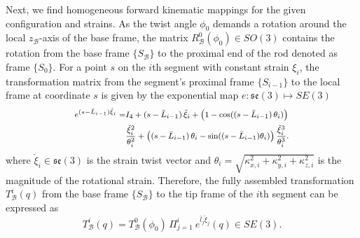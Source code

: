 Next, we find homogeneous forward kinematic mappings for the given configuration and strains.
As the twist angle $\phi_0$ demands a rotation around the local $z_{\mathcal{B}}$-axis of the base frame, the matrix $R_{\mathcal{B}}^0(\phi_0) \in SO(3)$ contains the rotation from the base frame $\{ S_{\mathcal{B}} \}$ to the proximal end of the rod denoted as frame $\{ S_{0} \}$.
For a point $s$ on the $i$th segment with constant strain $\xi_i$, the transformation matrix from the segment's proximal frame $\{ S_{i-1} \}$ to the local frame at coordinate $s$ is given by the exponential map $e: \mathfrak{se}(3) \mapsto SE(3)$~\cite{renda2018discrete}
\begin{equation}\footnotesize
\begin{split}
    e^{(s-\bar{L}_{i-1}) \check{\xi}_i} =& I_4 + (s-\bar{L}_{i-1}) \, \check{\xi}_i + \left ( 1 - \cos((s-\bar{L}_{i-1}) \, \theta_i) \right )\\ 
    &\frac{\check{\xi}_i^2}{\theta_i^2} + \left ( (s-\bar{L}_{i-1}) \, \theta_i - \sin((s-\bar{L}_{i-1}) \theta_i) \right ) \frac{\check{\xi}_i^3}{\theta_i^3}.
\end{split}
\end{equation}
where $\check{\xi}_i \in \mathfrak{se}(3)$ is the strain twist vector and $\theta_i = \sqrt{\kappa_{x,i}^2 + \kappa_{y,i}^2 + \kappa_{z,i}^2}$ is the magnitude of the rotational strain.
Therefore, the fully assembled transformation $T_{\mathcal{B}}^i(q)$ from the base frame $\{ S_{\mathcal{B}} \}$ to the tip frame of the $i$th segment can be expressed as
\begin{equation}
    T_{\mathcal{B}}^i(q) = T_{\mathcal{B}}^0(\phi_0) \, \Pi_{j=1}^{i} \: e^{\bar{l}_{j} \check{\xi}_{j}}(q) \in SE(3).
\end{equation}


